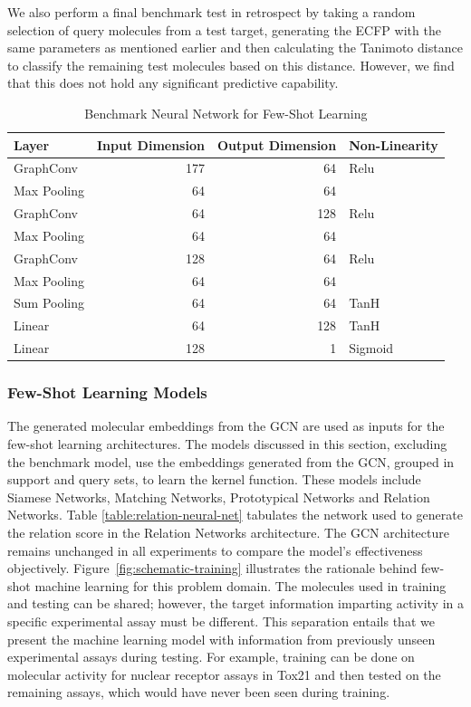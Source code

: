 We also perform a final benchmark test in retrospect by taking a random selection of query molecules from a test target, generating the ECFP with the same parameters as mentioned earlier and then calculating the Tanimoto distance to classify the remaining test molecules based on this distance. However, we find that this does not hold any significant predictive capability. 

\begin{table}
    \centering
    \begin{tabular}{@{}lrrl@{}}
    \hline
    \textbf{Layer} & \textbf{Input Dimension} & \textbf{Output Dimension} & \textbf{Non-Linearity} \\
    \hline
    GraphConv   & 177   & 64    & Relu \\
    Max Pooling & 64    & 64    &  \\
    GraphConv   & 64    & 128   & Relu \\
    Max Pooling & 64    & 64    &  \\
    GraphConv   & 128   & 64    & Relu \\
    Max Pooling & 64    & 64    &  \\
    Sum Pooling & 64    & 64    & TanH \\
    Linear      & 64    & 128   & TanH \\
    Linear      & 128   & 1     & Sigmoid \\
    \hline
    \end{tabular}
    \caption{Benchmark Neural Network for Few-Shot Learning}
    \label{table:benchmarkArchi}
\end{table}

\subsubsection{Few-Shot Learning Models}

The generated molecular embeddings from the GCN are used as inputs for the few-shot learning architectures. The models discussed in this section, excluding the benchmark model, use the embeddings generated from the GCN, grouped in support and query sets, to learn the kernel function. These models include Siamese Networks, Matching Networks, Prototypical Networks and Relation Networks. Table \ref{table:relation-neural-net} tabulates the network used to generate the relation score in the Relation Networks architecture. The GCN architecture remains unchanged in all experiments to compare the model's effectiveness objectively. Figure~\ref{fig:schematic-training} illustrates the rationale behind few-shot machine learning for this problem domain. The molecules used in training and testing can be shared; however, the target information imparting activity in a specific experimental assay must be different. This separation entails that we present the machine learning model with information from previously unseen experimental assays during testing. For example, training can be done on molecular activity for nuclear receptor assays in Tox21 and then tested on the remaining assays, which would have never been seen during training.

